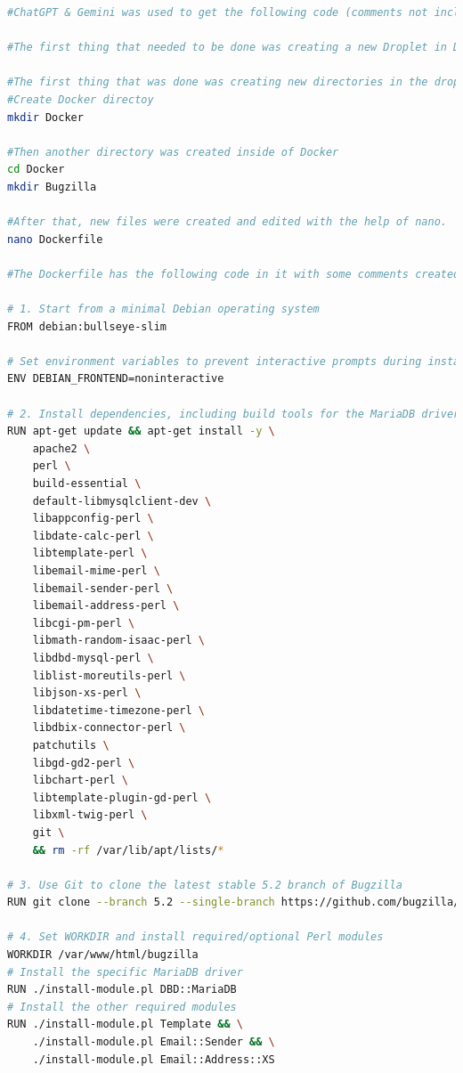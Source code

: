 \begin{lstlisting}[style=linuxstyle, language=bash]
#ChatGPT & Gemini was used to get the following code (comments not included):

#The first thing that needed to be done was creating a new Droplet in Digital Ocean. By clicking Create, then selecting the closest database location (New York), and then naming the droplet and selecting a payment plan. After that, a password was created then the droplet was created with the name of bugzilla-droplet. After this, the console was opened through Digital Ocean and then code was used.

#The first thing that was done was creating new directories in the droplet.
#Create Docker directoy
mkdir Docker

#Then another directory was created inside of Docker
cd Docker
mkdir Bugzilla

#After that, new files were created and edited with the help of nano.
nano Dockerfile

#The Dockerfile has the following code in it with some comments created by Gemini AI:

# 1. Start from a minimal Debian operating system
FROM debian:bullseye-slim

# Set environment variables to prevent interactive prompts during installation
ENV DEBIAN_FRONTEND=noninteractive

# 2. Install dependencies, including build tools for the MariaDB driver
RUN apt-get update && apt-get install -y \
    apache2 \
    perl \
    build-essential \
    default-libmysqlclient-dev \
    libappconfig-perl \
    libdate-calc-perl \
    libtemplate-perl \
    libemail-mime-perl \
    libemail-sender-perl \
    libemail-address-perl \
    libcgi-pm-perl \
    libmath-random-isaac-perl \
    libdbd-mysql-perl \
    liblist-moreutils-perl \
    libjson-xs-perl \
    libdatetime-timezone-perl \
    libdbix-connector-perl \
    patchutils \
    libgd-gd2-perl \
    libchart-perl \
    libtemplate-plugin-gd-perl \
    libxml-twig-perl \
    git \
    && rm -rf /var/lib/apt/lists/*

# 3. Use Git to clone the latest stable 5.2 branch of Bugzilla
RUN git clone --branch 5.2 --single-branch https://github.com/bugzilla/bugzilla.git /var/www/html/bugzilla

# 4. Set WORKDIR and install required/optional Perl modules
WORKDIR /var/www/html/bugzilla
# Install the specific MariaDB driver
RUN ./install-module.pl DBD::MariaDB
# Install the other required modules
RUN ./install-module.pl Template && \
    ./install-module.pl Email::Sender && \
    ./install-module.pl Email::Address::XS


\end{lstlisting}
